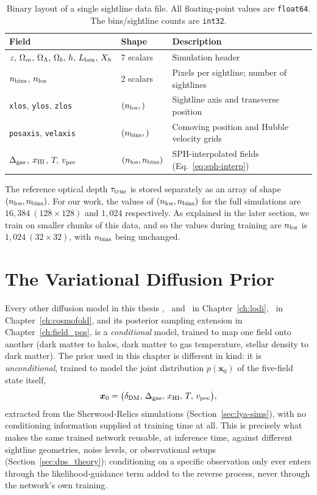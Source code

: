 \begin{table}[h!]
\centering
\caption{Binary layout of a single sightline data file. All floating-point values are \texttt{float64}. The bins/sightline counts are \texttt{int32}.}
\label{tab:lya-format}
\begin{tabular}{lll}
\hline
Field & Shape & Description \\
\hline
$z,\,\Omega_m,\,\Omega_\Lambda,\,\Omega_b,\,h,\,L_{\rm box},\,X_h$ & 7 scalars & Simulation header \\
$n_{\rm bins}$, $n_{\rm los}$ & 2 scalars & Pixels per sightline; number of sightlines \\
 \texttt{xlos}, \texttt{ylos}, \texttt{zlos} & $(n_{\rm los},)$ & Sightline axis and transverse position \\
\texttt{posaxis}, \texttt{velaxis} & $(n_{\rm bins},)$ & Comoving position and Hubble velocity grids \\
$\Delta_{\rm gas}$, $x_{\rm HI}$, $T$, $v_{\rm pec}$ & $(n_{\rm los},n_{\rm bins})$ & SPH-interpolated fields (Eq.~\ref{eq:sph-interp}) \\
\hline
\end{tabular}
\end{table}

The reference optical depth $\tau_{\rm true}$ is stored separately as an array of shape $(n_{\rm los}, n_{\rm bins})$. For our work, the values of $(n_{\rm los}, n_{\rm bins})$ for the full simulations are $16,384~(128\times128)$ and $1,024$ respectively. As explained in the later section, we train on smaller chunks of this data, and so the values during training are $n_{\rm los}$ is $1,024~(32\times32)$, with $n_{\rm bins}$ being unchanged.

\section{The Variational Diffusion Prior}
\label{sec:dps_architecture}

Every other diffusion model in this thesis , \HALOgen\ and \LODI\ in Chapter~\ref{ch:lodi}, \FOLD\ in Chapter~\ref{ch:cosmofold}, and its posterior sampling extension in Chapter~\ref{ch:field_pos}, is a \emph{conditional} model, trained to map one field onto another (dark matter to halos, dark matter to gas temperature, stellar density to dark matter). The prior used in this chapter is different in kind: it is \emph{unconditional}, trained to model the joint distribution $p(\bm{x}_0)$ of the five-field state itself,
\begin{equation}
    \bm{x}_0 = \big(\delta_{\rm DM},\,\Delta_{\rm gas},\,x_{\rm HI},\,T,\,v_{\rm pec}\big),
    \label{eq:dps_state}
\end{equation}
extracted from the Sherwood-Relics simulations (Section~\ref{sec:lya-sims}), with no conditioning information supplied at training time at all. This is precisely what makes the same trained network reusable, at inference time, against different sightline geometries, noise levels, or observational setups (Section~\ref{sec:dps_theory}): conditioning on a specific observation only ever enters through the likelihood-guidance term added to the reverse process, never through the network's own training.

